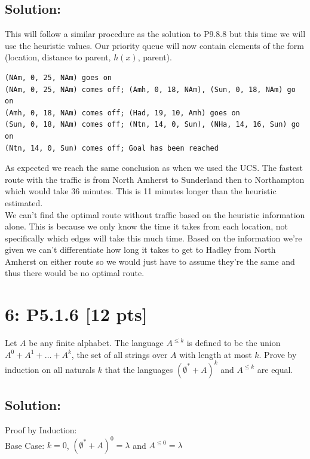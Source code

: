 \documentclass[12pt]{article}
\begin{document}
\subsection*{\textbf{Solution:}}
This will follow a similar procedure as the solution to P9.8.8 but this time we will use the heuristic values. Our priority queue will now contain elements of the form (location, distance to parent, $h(x)$, parent).

\begin{verbatim}
(NAm, 0, 25, NAm) goes on
(NAm, 0, 25, NAm) comes off; (Amh, 0, 18, NAm), (Sun, 0, 18, NAm) go on
(Amh, 0, 18, NAm) comes off; (Had, 19, 10, Amh) goes on
(Sun, 0, 18, NAm) comes off; (Ntn, 14, 0, Sun), (NHa, 14, 16, Sun) go on
(Ntn, 14, 0, Sun) comes off; Goal has been reached
\end{verbatim}

\noindent
As expected we reach the same conclusion as when we used the UCS. The fastest route with the traffic is from North Amherst to Sunderland then to Northampton which would take 36 minutes. This is 11 minutes longer than the heuristic estimated. 
\\

\noindent
We can't find the optimal route without traffic based on the heuristic information alone. This is because we only know the time it takes from each location, not specifically which edges will take this much time. Based on the information we're given we can't differentiate how long it takes to get to Hadley from North Amherst on either route so we would just have to assume they're the same and thus there would be no optimal route.

\newpage
\section*{\textbf{6: P5.1.6} [12 pts]}
Let $A$ be any finite alphabet. The language $A^{\leq k}$ is defined to be the union $A^0+ A^1+ \ldots + A^k$, the set of all strings over $A$ with length at most $k$. Prove by induction on all naturals $k$ that the languages $(\emptyset ^* + A)^k$ and $A^{\leq k}$ are equal.


\subsection*{\textbf{Solution:}}
Proof by Induction:\\

Base Case: $k=0$, $(\emptyset ^* + A)^0 = \lambda$ and $A^{\leq 0} = \lambda$\\
\end{document}
